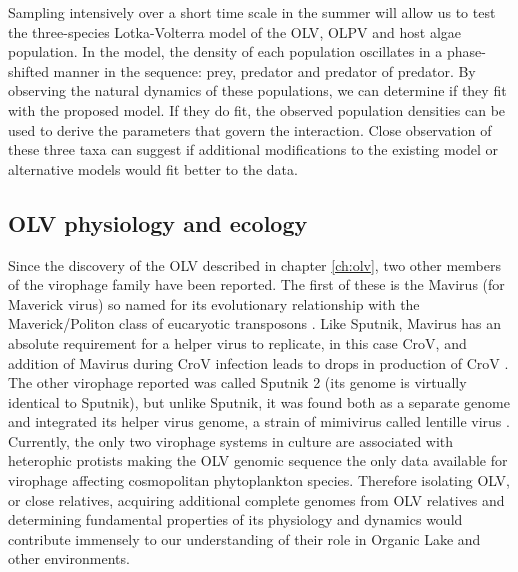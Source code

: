Sampling intensively over a short time scale in the summer will allow us to test the three-species Lotka-Volterra model of the \ac{OLV}, \ac{OLPV} and host algae population.
In the model, the density of each population oscillates in a phase-shifted manner in the sequence: prey, predator and predator of predator.
By observing the natural dynamics of these populations, we can determine if they fit with the proposed model.
If they do fit, the observed population densities can be used to derive the parameters that govern the interaction.
Close observation of these three taxa can suggest if additional modifications to the existing model or alternative models would fit better to the data.


\subsection{\acs{OLV} physiology and ecology}
Since the discovery of the \ac{OLV} described in chapter \ref{ch:olv}, two other members of the virophage family have been reported.
The first of these is the Mavirus (for Maverick virus) so named for its evolutionary relationship with the Maverick/Politon class of eucaryotic transposons \cite{Fischer2011a}.
Like Sputnik, Mavirus has an absolute requirement for a helper virus to replicate, in this case \ac{CroV}, and addition of Mavirus during \ac{CroV} infection leads to drops in production of \ac{CroV} \cite{Fischer2011a}.
The other virophage reported was called Sputnik 2 (its genome is virtually identical to Sputnik), but unlike Sputnik, it was found both as a separate genome and integrated its helper virus genome, a strain of mimivirus called lentille virus \cite{Desnues2012}.
Currently, the only two virophage systems in culture are associated with heterophic protists making the \ac{OLV} genomic sequence the only data available for virophage affecting cosmopolitan phytoplankton species.
Therefore isolating \ac{OLV}, or close relatives, acquiring additional complete genomes from \ac{OLV} relatives and determining fundamental properties of its physiology and dynamics would contribute immensely to our understanding of their role in Organic Lake and other environments. 

